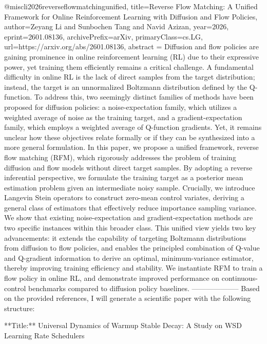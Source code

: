 {}@misc{li2026reverseflowmatchingunified,
      title={Reverse Flow Matching: A Unified Framework for Online Reinforcement Learning with Diffusion and Flow Policies}, 
      author={Zeyang Li and Sunbochen Tang and Navid Azizan},
      year={2026},
      eprint={2601.08136},
      archivePrefix={arXiv},
      primaryClass={cs.LG},
      url={https://arxiv.org/abs/2601.08136},
      abstract = {Diffusion and flow policies are gaining prominence in online reinforcement learning (RL) due to their expressive power, yet training them efficiently remains a critical challenge. A fundamental difficulty in online RL is the lack of direct samples from the target distribution; instead, the target is an unnormalized Boltzmann distribution defined by the Q-function. To address this, two seemingly distinct families of methods have been proposed for diffusion policies: a noise-expectation family, which utilizes a weighted average of noise as the training target, and a gradient-expectation family, which employs a weighted average of Q-function gradients. Yet, it remains unclear how these objectives relate formally or if they can be synthesized into a more general formulation. In this paper, we propose a unified framework, reverse flow matching (RFM), which rigorously addresses the problem of training diffusion and flow models without direct target samples. By adopting a reverse inferential perspective, we formulate the training target as a posterior mean estimation problem given an intermediate noisy sample. Crucially, we introduce Langevin Stein operators to construct zero-mean control variates, deriving a general class of estimators that effectively reduce importance sampling variance. We show that existing noise-expectation and gradient-expectation methods are two specific instances within this broader class. This unified view yields two key advancements: it extends the capability of targeting Boltzmann distributions from diffusion to flow policies, and enables the principled combination of Q-value and Q-gradient information to derive an optimal, minimum-variance estimator, thereby improving training efficiency and stability. We instantiate RFM to train a flow policy in online RL, and demonstrate improved performance on continuous-control benchmarks compared to diffusion policy baselines.}
}
        --------------------
         Based on the provided references, I will generate a scientific paper with the following structure:

**Title:** 
Universal Dynamics of Warmup Stable Decay: A Study on WSD Learning Rate Schedulers

